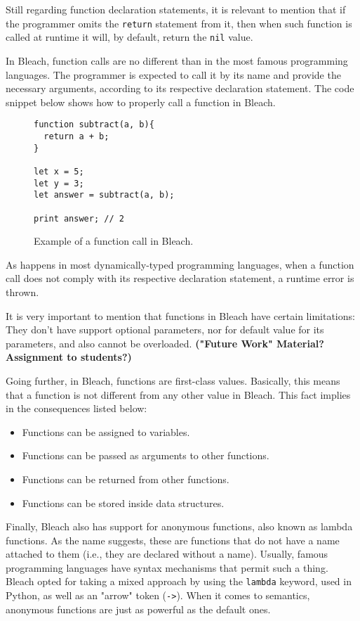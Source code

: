 Still regarding function declaration statements, it is relevant to mention that if the programmer omits the \texttt{return} statement from it, then when such function is called at runtime it will, by default, return the \texttt{nil} value.

In Bleach, function calls are no different than in the most famous programming languages. The programmer is expected to call it by its name and provide the necessary arguments, according to its respective declaration statement. The code snippet below shows how to properly call a function in Bleach.

\begin{figure}[H]
    \centering
    \begin{lstlisting}
function subtract(a, b){
  return a + b;
}

let x = 5;
let y = 3;
let answer = subtract(a, b);

print answer; // 2
    \end{lstlisting}
    \caption{Example of a function call in Bleach.}
\end{figure}

As happens in most dynamically-typed programming languages, when a function call does not comply with its respective declaration statement, a runtime error is thrown.

It is very important to mention that functions in Bleach have certain limitations: They don't have support optional parameters, nor for default value for its parameters, and also cannot be overloaded. \textbf{("Future Work" Material? Assignment to students?)}

Going further, in Bleach, functions are first-class values. Basically, this means that a function is not different from any other value in Bleach. This fact implies in the consequences listed below:

\begin{itemize}
    \item Functions can be assigned to variables.
    \item Functions can be passed as arguments to other functions.
    \item Functions can be returned from other functions.
    \item Functions can be stored inside data structures.
\end{itemize}

Finally, Bleach also has support for anonymous functions, also known as lambda functions. As the name suggests, these are functions that do not have a name attached to them (i.e., they are declared without a name). Usually, famous programming languages have syntax mechanisms that permit such a thing. Bleach opted for taking a mixed approach by using the \texttt{lambda} keyword, used in Python, as well as an "arrow" token (\texttt{->}). When it comes to semantics, anonymous functions are just as powerful as the default ones.

